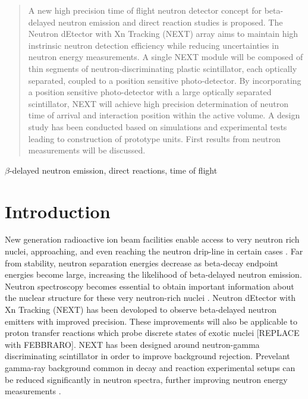 \documentclass[preprint,3p,twocolumn]{elsarticle}
\begin{document}
\begin{frontmatter}
\begin{abstract}
A new high precision time of flight neutron detector concept for beta-delayed neutron emission and direct reaction studies is proposed. The Neutron dEtector with Xn Tracking (NEXT) array aims to maintain high instrinsic neutron detection efficiency while reducing uncertainties in neutron energy measurements. A single NEXT module will be composed of thin segments of neutron-discriminating plastic scintillator, each optically separated, coupled to a position sensitive photo-detector. By incorporating a position sensitive photo-detector with a large optically separated scintillator, NEXT will achieve high precision determination of neutron time of arrival and interaction position within the active volume. A design study has been conducted based on simulations and experimental tests leading to construction of prototype units. First results from neutron measurements will be discussed. 
\end{abstract}

\begin{keyword}
$\beta$-delayed neutron emission, direct reactions, time of flight 
\end{keyword}

\end{frontmatter}



\section{Introduction}
New generation radioactive ion beam facilities enable access to very neutron rich nuclei, approaching, and even reaching the neutron drip-line in certain cases \cite{FRIB}.
Far from stability, neutron separation energies decrease as beta-decay endpoint energies become large, increasing the likelihood of beta-delayed neutron emission. Neutron spectroscopy becomes essential to obtain important information about the nuclear structure for these very neutron-rich nuclei \cite{RevModPhys.84.567,NAKAMURA201753,BLANK2008403}. 
Neutron dEtector with Xn Tracking (NEXT) has been devoloped to observe beta-delayed neutron emitters with improved precision. 
These improvements will also be applicable to proton transfer reactions which probe discrete states of exotic nuclei [REPLACE with FEBBRARO].
NEXT has been designed around neutron-gamma discriminating scintillator in order to improve background rejection. Prevelant gamma-ray background common in decay and reaction experimental setups can be reduced significantly in neutron spectra, further improving neutron energy measurements \cite{FEBBRARO2018189}.
\end{document}
